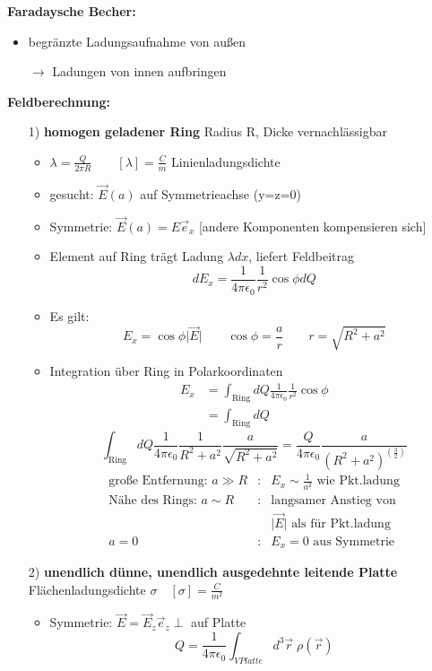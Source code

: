 \documentclass[titlepage,12pt,a4paper,ngerman]{report}
\newcommand{\tx}[1]{\textrm{#1}}
\begin{document}
\textbf{Faradaysche Becher:}
\begin{itemize}
\item begränzte Ladungsaufnahme von außen
\item[$\rightarrow$] Ladungen von innen aufbringen
\end{itemize}
\textbf{Feldberechnung:}
\begin{itemize}
\item[1)] \textbf{homogen geladener Ring} Radius R, Dicke vernachlässigbar
\begin{itemize}
\item $\lambda = \frac{Q}{2\pi R} \qquad [\lambda] = \frac{C}{m}$ Linienladungsdichte
\item gesucht: $\vec{E}(a)$ auf Symmetrieachse (y=z=0)
\item Symmetrie: $\vec{E}(a) = E \vec{e}_x$ [andere Komponenten kompensieren sich]
\item Element auf Ring trägt Ladung $\lambda dx$, liefert Feldbeitrag $$dE_x = \frac{1}{4\pi \epsilon_0} \frac{1}{r^2} \cos \phi dQ$$
\item Es gilt: $$E_x = \cos \phi \vert \vec{E} \vert \qquad \cos\phi = \frac{a}{r} \qquad r= \sqrt{R^2+a^2}$$
\item Integration über Ring in Polarkoordinaten 
\begin{align*}
E_x & = \int_{\tx{Ring}} dQ \frac{1}{4\pi\epsilon_0} \frac{1}{r^2} \cos \phi \\
& = \int_{\tx{Ring}}dQ 
\end{align*}
$$\int_{\tx{Ring}} dQ \frac{1}{4\pi\epsilon_0} \frac{1}{R^2+a^2}\frac{a}{\sqrt{R^2+a^2}} = \frac{Q}{4\pi\epsilon_0} \frac{a}{(R^2+a^2)^{(\frac{3}{2})}}$$
\begin{align*}
\textrm{große Entfernung: }  a\gg R &: & E_x \sim \frac{1}{a^2} \textrm{ wie Pkt.ladung}\\
\textrm{Nähe des Rings: }  a \sim R  &: & \textrm{langsamer Anstieg von }\\ & & \vert \vec{E} \vert \textrm{ als für Pkt.ladung}\\
 a=0&: &E_x = 0  \textrm{ aus Symmetrie }
\end{align*}
\end{itemize}
\item[2)] \textbf{unendlich dünne, unendlich ausgedehnte leitende Platte}\\ Flächenladungsdichte $\sigma \quad [\sigma] = \frac{C}{m^2}$
\begin{itemize}
\item Symmetrie: $\vec{E} = \vec{E}_z \vec{e}_z \perp $ auf Platte
$$Q = \frac{1}{4 \pi \epsilon_0} \int_{V Platte} d^3 \vec{r}\; \rho ( \vec{r})$$


\end{itemize}
\end{itemize}
\end{document}
